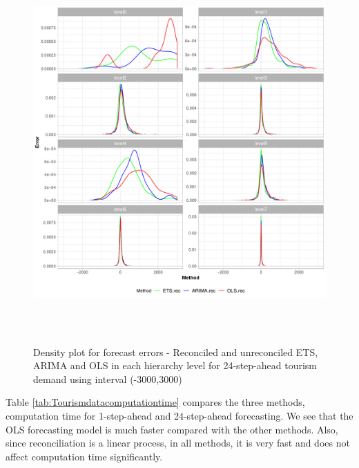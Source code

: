 \documentclass[11pt,a4paper,]{article}
\begin{document}
\begin{figure}

{\centering \includegraphics[width=450px,height=550px]{Paper-Figures/results_Tourism/densityplot_24} 

}

\caption{Density plot for forecast errors - Reconciled and unreconciled ETS, ARIMA and OLS in each hierarchy level for 24-step-ahead tourism demand using interval (-3000,3000)}\label{fig:densityplottourism}
\end{figure}

Table \ref{tab:Tourismdatacomputationtime} compares the three methods,
computation time for 1-step-ahead and 24-step-ahead forecasting. We see
that the OLS forecasting model is much faster compared with the other
methods. Also, since reconciliation is a linear process, in all methods,
it is very fast and does not affect computation time significantly.
\end{document}

